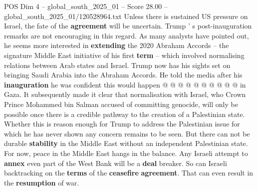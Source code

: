 \begin{textsample}{POS Dim 4 – global\_south\_2025\_01 – Score 28.00 – global\_south\_2025\_01/120528964.txt}
Unless there is sustained US pressure on Israel, the fate of the \textbf{agreement} will be uncertain.
Trump ' s post-inauguration remarks are not encouraging in this regard.
As many analysts have pointed out, he seems more interested in \textbf{extending} the 2020 Abraham Accords -- the signature Middle East initiative of his first \textbf{term} -- which involved normalising relations between Arab states and Israel.
Trump now has his sights set on bringing Saudi Arabia into the Abraham Accords.
He told the media after his \textbf{inauguration} he was confident this would happen @ @ @ @ @ @ @ @ @ @ in Gaza.
It subsequently made it clear that normalisation with Israel, who Crown Prince Mohammed bin Salman accused of committing genocide, will only be possible once there is a credible pathway to the creation of a Palestinian state.
Whether this is reason enough for Trump to address the Palestinian issue for which he has never shown any concern remains to be seen.
But there can not be durable \textbf{stability} in the Middle East without an independent Palestinian state.
For now, peace in the Middle East hangs in the balance.
Any Israeli attempt to \textbf{annex} even part of the West Bank will be a \textbf{deal} breaker.
So can Israeli backtracking on the \textbf{terms} of the \textbf{ceasefire} \textbf{agreement}.
That can even result in the \textbf{resumption} of war.

\end{textsample}
